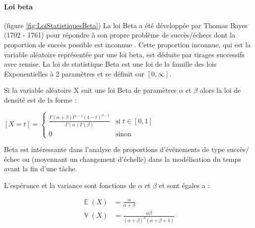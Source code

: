 \documentclass[a4paper,12pt]{report}
\DeclareMathOperator{\E}{\mathbb{E}} %
\DeclareMathOperator{\V}{\mathbb{V}} %
\theoremstyle{plain}				%
\theoremstyle{definition}				%
\begin{document}
\paragraph{Loi beta} (figure \ref{fig:LoiStatistiquesBeta})
La loi Beta a été développée par Thomas Bayes (1702 - 1761) pour répondre à son propre problème 
  de succès/échecs dont la proportion de succès possible est inconnue \cite{bayes1991essay}. Cette proportion inconnue, qui est la variable aléatoire représentée par une loi beta, est déduite par tirages successifs avec remise. 
La loi de statistique Beta est une loi de la famille des lois Exponentielles à 2 paramètres et se définit 
  sur $[0, \infty]$. 
 

Si la variable aléatoire X suit une loi Beta de paramètres $\alpha$ et $\beta$ alors la loi de densité est de la forme :
  \begin{center}
  $[X=t] = \left\{
    \begin{array}{ll}
    \frac{\Gamma(\alpha + \beta) t^{\alpha-1} (1-t)^{\beta-1}}{\Gamma(\alpha) \Gamma(\beta)}
    & 
   	\mbox{si } t \in [0,1]  \\
        0 & 
        \mbox{sinon}
    \end{array}
	\right.$
  \label{definitionLoiBetaDensite}
  \end{center}

Beta est intéressante dans l'analyse de proportions d’événements de type succès/échec ou
(moyennant un changement d'échelle) dans la modélisation du temps avant la fin d'une tâche.

L’espérance et la variance sont fonctions de $\alpha$ et $\beta$ et sont égales a :

\begin{align*}
	\E(X) &= \frac{\alpha}{\alpha + \beta} \\
	\V(X) &= \frac{\alpha \beta}{(\alpha + \beta)^2 (\alpha + \beta + 1)} 
\end{align*}
\end{document}
